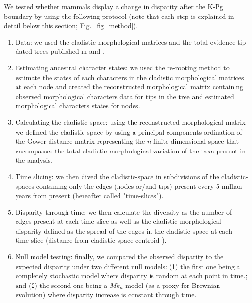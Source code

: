 \documentclass[12pt,letterpaper]{article}
\begin{document}
We tested whether mammals display a change in disparity after the K-Pg boundary by using the following protocol (note that each step is explained in detail below this section; Fig.~\ref{fig_method}).
\begin{enumerate}
\item{Data: we used the cladistic morphological matrices and the total evidence tip-dated trees published in \cite{MEE3:MEE312084} and \cite{beckancient2014}.} \\
\item{Estimating ancestral character states: we used the \cite{Yang01121995} re-rooting method to estimate the states of each characters in the cladistic morphological matrices at each node and created the reconstructed morphological matrix containing observed morphological characters data for tips in the tree and estimated morphological characters states for nodes.}\\
\item{Calculating the cladistic-space: using the reconstructed morphological matrix we defined the cladistic-space by using a principal components ordination of the Gower distance matrix \citep{Gower71} representing the $n$ finite dimensional space that encompasses the total cladistic morphological variation of the taxa present in the analysis.} \\
\item{Time slicing: we then dived the cladistic-space in subdivisions of the cladistic-spaces containing only the edges (nodes or/and tips) present every 5 million years from present (hereafter called "time-slices").} \\
\item{Disparity through time: we then calculate the diversity as the number of edges present at each time-slice as well as the cladistic morphological disparity defined as the spread of the edges in the cladistic-space at each time-slice (distance from cladistic-space centroid \citep{finlay2015morphological}).} \\
\item{Null model testing: finally, we compared the observed disparity to the expected disparity under two different null models: (1) the first one being a completely stochastic model where disparity is random at each point in time.; and (2) the second one being a $Mk_n$ model (as a proxy for Brownian evolution) where disparity increase is constant through time.} \\
\end{enumerate}
\end{document}

